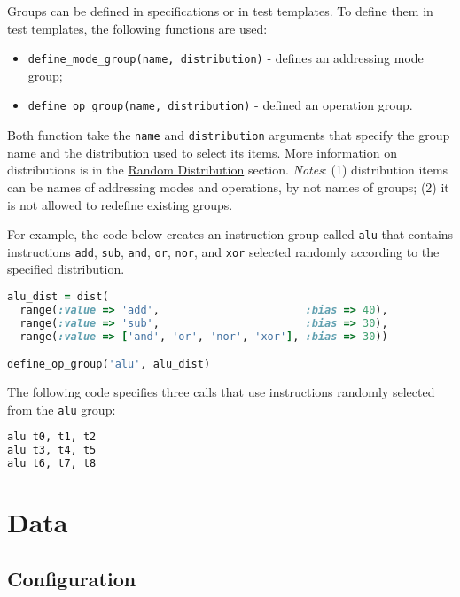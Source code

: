 \documentclass[oneside,final,12pt]{extreport}
\begin{document}
Groups can be defined in specifications or in test templates. To define them in
test templates, the following functions are used: 

\begin{itemize}
\item \texttt{define{\_}mode{\_}group(name, distribution)} - defines an addressing mode\\group;
\item \texttt{define{\_}op{\_}group(name, distribution)} - defined an operation group.
\end{itemize}

Both function take the \texttt{name} and \texttt{distribution} arguments that specify
the group name and the distribution used to select its items.
More information on distributions is in the
\hyperref[Random_Distribution]{Random Distribution} section.
\emph{Notes}: (1) distribution items can be names of addressing modes and operations, by not
names of groups; (2) it is not allowed to redefine existing groups.

For example, the code below creates an instruction group called \texttt{alu} that contains
instructions \texttt{add}, \texttt{sub}, \texttt{and}, \texttt{or}, \texttt{nor}, and \texttt{xor}
selected randomly according to the specified distribution.

\begin{lstlisting}[language=ruby]
alu_dist = dist(
  range(:value => 'add',                       :bias => 40),
  range(:value => 'sub',                       :bias => 30),
  range(:value => ['and', 'or', 'nor', 'xor'], :bias => 30))

define_op_group('alu', alu_dist)
\end{lstlisting}

The following code specifies three calls that use instructions randomly selected
from the \texttt{alu} group:
 
\begin{lstlisting}[language=ruby]
alu t0, t1, t2
alu t3, t4, t5
alu t6, t7, t8
\end{lstlisting}


\section{Data}

\subsection{Configuration}
\end{document}
